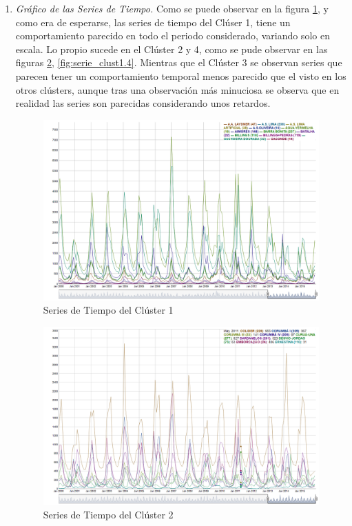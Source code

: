 \documentclass[12pt,oneside]{book}\usepackage[]{graphicx}\usepackage[]{color}
\theoremstyle{definition} %
\begin{document}
\begin{enumerate}
\item \textit{Gráfico de las Series de Tiempo.} Como se puede observar en la figura \ref{fig:serie_clust1.1}, y como era de esperarse, las series de tiempo del Clúser 1, tiene un comportamiento parecido en todo el periodo considerado, variando solo en escala. Lo propio sucede en el Clúster 2 y 4, como se pude observar en las figuras \ref{fig:serie_clust1.2}, \ref{fig:serie_clust1.4}. Mientras que el Clúster 3 se observan series que parecen tener un comportamiento temporal menos parecido que el visto en los otros clústers, aunque tras una observación más minuciosa se observa que en realidad las series son parecidas considerando unos retardos.
\begin{figure}[H]
\centering
\includegraphics[scale=0.4]{Resultados/Cluster1/1_series_cluster}
\caption{Series de Tiempo del Clúster 1}\label{fig:serie_clust1.1}
\end{figure}


\begin{figure}[H]
\centering
\includegraphics[scale=0.5]{Resultados/Cluster2/1_series_cluster}
\caption{Series de Tiempo del Clúster 2}\label{fig:serie_clust1.2}
\end{figure}


\end{enumerate}
\end{document}
